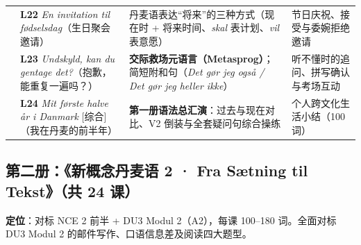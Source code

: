 \documentclass[10.5pt, a4paper]{ctexart}
\begin{document}
{\begin{longtable}{@{} >{\raggedright\arraybackslash}p{2.65cm} >{\raggedright\arraybackslash}p{4.6cm} >{\raggedright\arraybackslash}p{5.15cm} >{\raggedright\arraybackslash}p{3.2cm} @{}}
 & \textbf{L22} \textit{En invitation til fødselsdag}\newline （生日聚会邀请） & 丹麦语表达“将来”的三种方式（现在时 + 将来时间、\textit{skal} 表计划、\textit{vil} 表意愿） & 节日庆祝、接受与委婉拒绝邀请 \\
 & \textbf{L23} \textit{Undskyld, kan du gentage det?}\newline （抱歉，能重复一遍吗？） & \textbf{交际救场元语言（Metasprog）}；简短附和句（\textit{Det gør jeg også / Det gør jeg heller ikke}） & 听不懂时的追问、拼写确认与考场互动 \\
 & \textbf{L24} \textit{Mit første halve år i Danmark} [综合]\newline （我在丹麦的前半年） & \textbf{第一册语法总汇演}：过去与现在对比、V2 倒装与全套疑问句综合操练 & 个人跨文化生活小结（100 词） \\
\end{longtable}
}

\subsection{第二册：《新概念丹麦语 2 · Fra Sætning til Tekst》（共 24 课）}
\textbf{定位}：对标 NCE 2 前半 + DU3 Modul 2（A2），每课 100--180 词。全面对标 DU3 Modul 2 的邮件写作、口语信息差及阅读四大题型。
\end{document}

